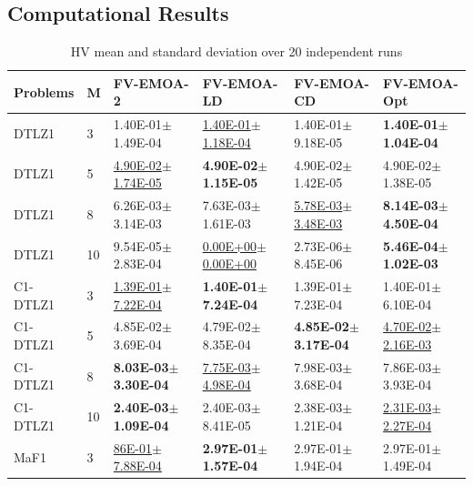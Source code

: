 \documentclass[conference]{IEEEtran}
\begin{document}
\subsection{Computational Results}
\begin{table}[!t]
  \renewcommand{\arraystretch}{1.3}
  \caption{HV mean and standard deviation over 20 independent runs} %
  \label{table_hv_FVEMOA}
  \centering
  \begin{tabular*}{\textwidth}{l|l|m{3.5cm}m{3.5cm}m{3.5cm}m{3.5cm}}
    \hline
    Problems        & M  & FV-EMOA-2                         & FV-EMOA-LD                        & FV-EMOA-CD                        & FV-EMOA-Opt   \\ 
    \hline
    DTLZ1           & 3  & 1.40E-01$\pm$1.49E-04             & \underline{1.40E-01$\pm$1.18E-04} & 1.40E-01$\pm$9.18E-05             & \textbf{1.40E-01$\pm$1.04E-04} \\
    DTLZ1           & 5  & \underline{4.90E-02$\pm$1.74E-05} & \textbf{4.90E-02$\pm$1.15E-05}    & 4.90E-02$\pm$1.42E-05             & 4.90E-02$\pm$1.38E-05 \\
    DTLZ1           & 8  & 6.26E-03$\pm$3.14E-03             & 7.63E-03$\pm$1.61E-03             & \underline{5.78E-03$\pm$3.48E-03} & \textbf{8.14E-03$\pm$4.50E-04} \\
    DTLZ1           & 10 & 9.54E-05$\pm$2.83E-04             & \underline{0.00E+00$\pm$0.00E+00} & 2.73E-06$\pm$8.45E-06             & \textbf{5.46E-04$\pm$1.02E-03} \\ 
    \hline
    C1-DTLZ1        & 3  & \underline{1.39E-01$\pm$7.22E-04} & \textbf{1.40E-01$\pm$7.24E-04}    & 1.39E-01$\pm$7.23E-04             & 1.40E-01$\pm$6.10E-04 \\
    C1-DTLZ1        & 5  & 4.85E-02$\pm$3.69E-04             & 4.79E-02$\pm$8.35E-04             & \textbf{4.85E-02$\pm$3.17E-04}    & \underline{4.70E-02$\pm$2.16E-03} \\
    C1-DTLZ1        & 8  & \textbf{8.03E-03$\pm$3.30E-04}    & \underline{7.75E-03$\pm$4.98E-04} & 7.98E-03$\pm$3.68E-04             & 7.86E-03$\pm$3.93E-04 \\
    C1-DTLZ1        & 10 & \textbf{2.40E-03$\pm$1.09E-04}    & 2.40E-03$\pm$8.41E-05             & 2.38E-03$\pm$1.21E-04             & \underline{2.31E-03$\pm$2.27E-04} \\ 
    \hline
    \hline
    MaF1            & 3  & \underline{86E-01$\pm$7.88E-04}   & \textbf{2.97E-01$\pm$1.57E-04}    & 2.97E-01$\pm$1.94E-04             & 2.97E-01$\pm$1.49E-04 \\

\end{tabular*}
\end{table}
\end{document}
